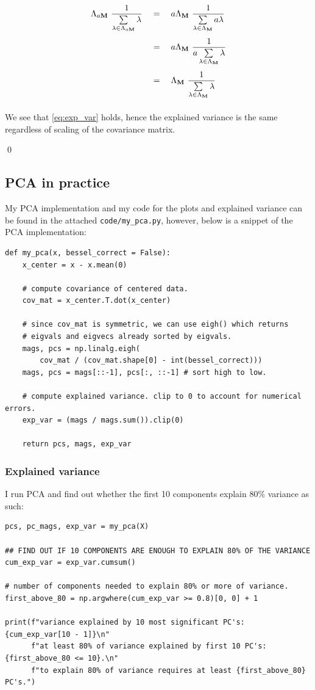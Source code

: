 \begin{align*}
\Lambda_{a \mathbf{M}}\ \frac{1}{\sum\limits_{\lambda \in \Lambda_{a \mathbf{M}}}
  \lambda}\quad
  &=\quad a \Lambda_{\mathbf{M}}\ \frac{1}{\sum\limits_{\lambda \in \Lambda_{\mathbf{M}}}
  a \lambda}\\[4pt]
  &=\quad a \Lambda_{\mathbf{M}}\ \frac{1}{a \sum\limits_{\lambda \in \Lambda_{\mathbf{M}}}
  \lambda}\\[4pt]
  &=\quad \Lambda_{\mathbf{M}}\ \frac{1}{\sum\limits_{\lambda \in \Lambda_{\mathbf{M}}}
  \lambda}\\[4pt]
\end{align*}

We see that \cref{eq:exp_var} holds, hence the explained variance is the same
regardless of scaling of the covariance matrix.

\qed

\newpage
\subsection{PCA in practice}

My PCA implementation and my code for the plots and explained variance can be
found in the attached \texttt{code/my\_pca.py}, however, below is a snippet of
the PCA implementation:

\begin{verbatim}
def my_pca(x, bessel_correct = False):
    x_center = x - x.mean(0)

    # compute covariance of centered data.
    cov_mat = x_center.T.dot(x_center)

    # since cov_mat is symmetric, we can use eigh() which returns
    # eigvals and eigvecs already sorted by eigvals.
    mags, pcs = np.linalg.eigh(
        cov_mat / (cov_mat.shape[0] - int(bessel_correct)))
    mags, pcs = mags[::-1], pcs[:, ::-1] # sort high to low.

    # compute explained variance. clip to 0 to account for numerical errors. 
    exp_var = (mags / mags.sum()).clip(0)

    return pcs, mags, exp_var
\end{verbatim}

\subsubsection{Explained variance}

I run PCA and find out whether the first 10 components explain 80\% variance as
such:

\begin{verbatim}
pcs, pc_mags, exp_var = my_pca(X)

## FIND OUT IF 10 COMPONENTS ARE ENOUGH TO EXPLAIN 80% OF THE VARIANCE
cum_exp_var = exp_var.cumsum()

# number of components needed to explain 80% or more of variance.
first_above_80 = np.argwhere(cum_exp_var >= 0.8)[0, 0] + 1

print(f"variance explained by 10 most significant PC's: {cum_exp_var[10 - 1]}\n"
      f"at least 80% of variance explained by first 10 PC's: {first_above_80 <= 10}.\n"
      f"to explain 80% of variance requires at least {first_above_80} PC's.")
\end{verbatim}

